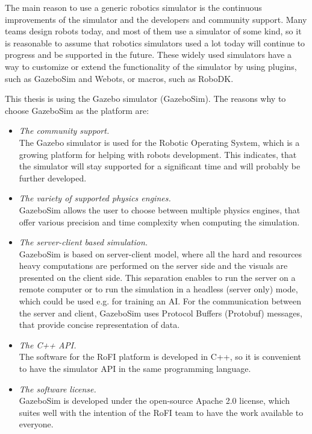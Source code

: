 \documentclass[
  digital, %
  table,   %
  oneside, %
  nolof,     %
  nolot,     %
]{fithesis3}
\begin{document}
The main reason to use a generic robotics simulator is the continuous improvements of the simulator and the developers and community support.
Many teams design robots today, and most of them use a simulator of some kind, so it is reasonable to assume that robotics simulators used a lot today will continue to progress and be supported in the future.
These widely used simulators have a way to customize or extend the functionality of the simulator by using plugins, such as GazeboSim\cite{gazebo} and Webots\cite{webots}, or macros, such as RoboDK\cite{robodk}.

This thesis is using the Gazebo simulator (GazeboSim).
The reasons why to choose GazeboSim as the platform are:
\begin{itemize}
    \item \emph{The community support.}\\
    The Gazebo simulator is used for the Robotic Operating System\cite{ros}, which is a growing platform for helping with robots development.
    This indicates, that the simulator will stay supported for a significant time and will probably be further developed.
    \item \emph{The variety of supported physics engines.}\\
    GazeboSim allows the user to choose between multiple physics engines, that offer various precision and time complexity when computing the simulation.
    \item \emph{The server-client based simulation.}\\
    GazeboSim is based on server-client model, where all the hard and resources heavy computations are performed on the server side and the visuals are presented on the client side.
    This separation enables to run the server on a remote computer or to run the simulation in a headless (server only) mode, which could be used e.g. for training an AI.
    For the communication between the server and client, GazeboSim uses Protocol Buffers (Protobuf)\cite{protobuf} messages, that provide concise representation of data.
    \item \emph{The C++ API.}\\
    The software for the RoFI platform is developed in C++, so it is convenient to have the simulator API in the same programming language.
    \item \emph{The software license.}\\
    GazeboSim is developed under the open-source Apache 2.0 license, which suites well with the intention of the RoFI team to have the work available to everyone.
\end{itemize}
\end{document}

